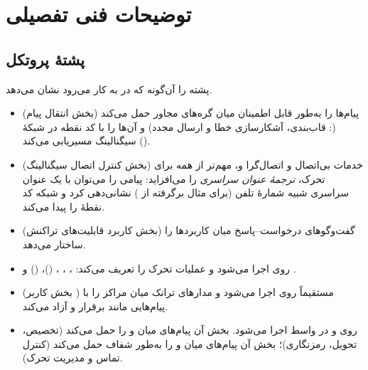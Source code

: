 \documentclass[11pt,a4paper]{article}
\begin{document}
\section{توضیحات فنی تفصیلی}

\subsection{پشتهٔ پروتکل }
 پشته را آن‌گونه که در  به کار می‌رود نشان می‌دهد.
\begin{itemize}
  \item \textbf{} (بخش انتقال پیام) پیام‌ها را به‌طور قابل اطمینان میان گره‌های
        مجاور حمل می‌کند (: قاب‌بندی، آشکارسازی خطا و ارسال مجدد) و آن‌ها را با کد
        نقطه در شبکهٔ سیگنالینگ مسیریابی می‌کند ().
  \item \textbf{} (بخش کنترل اتصال سیگنالینگ) خدمات بی‌اتصال و اتصال‌گرا و، مهم‌تر
        از همه برای تحرک، \emph{ترجمهٔ عنوان سراسری} را می‌افزاید: پیامی را می‌توان با یک عنوان
        سراسری شبیه شمارهٔ تلفن (برای مثال برگرفته از ) نشانی‌دهی کرد و شبکه کد نقطهٔ
         را پیدا می‌کند.
  \item \textbf{} (بخش کاربرد قابلیت‌های تراکنش) گفت‌وگوهای درخواست--پاسخ میان
        کاربردها را ساختار می‌دهد.
  \item \textbf{} \cite{ts29002} روی  اجرا می‌شود و عملیات تحرک را تعریف
        می‌کند: ، ، ،
         ()،  () و
        .
  \item \textbf{} (بخش کاربر ) مستقیماً روی  اجرا می‌شود و مدارهای
        ترانک میان مراکز را با پیام‌هایی مانند  برقرار و آزاد می‌کند.
  \item \textbf{} روی  و در واسط  اجرا می‌شود. بخش  آن
        پیام‌های میان  و  را حمل می‌کند (تخصیص، تحویل، رمزنگاری)؛ بخش
         آن پیام‌های میان  و  را به‌طور شفاف حمل می‌کند (کنترل تماس
        و مدیریت تحرک).
\end{itemize}

\begin{acnfigure}
  \caption{پشتهٔ  در شبکهٔ هستهٔ .  انتقال را فراهم می‌کند؛ 
  مدارهای ترانک را کنترل می‌کند؛  و  از گفت‌وگوهای تحرک  و
   در واسط  پشتیبانی می‌کنند.}
  \label{fig:ss7}
\end{acnfigure}
\end{document}

